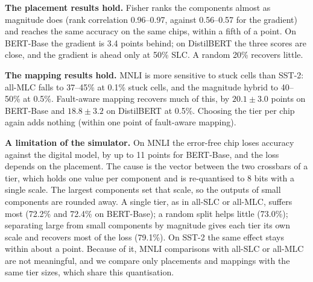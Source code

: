 \textbf{The placement results hold.} Fisher ranks the components almost as magnitude does (rank
correlation 0.96--0.97, against 0.56--0.57 for the gradient) and reaches the same accuracy on the same
chips, within a fifth of a point. On BERT-Base the gradient is 3.4 points behind; on DistilBERT the
three scores are close, and the gradient is ahead only at 50\% SLC. A random 20\% recovers little.

\textbf{The mapping results hold.} MNLI is more sensitive to stuck cells than SST-2: all-MLC falls to
37--45\% at 0.1\% stuck cells, and the magnitude hybrid to 40--50\% at 0.5\%. Fault-aware mapping recovers much of this,
by $20.1\pm3.0$ points on BERT-Base and $18.8\pm3.2$ on DistilBERT at 0.5\%. Choosing the tier per chip
again adds nothing (within one point of fault-aware mapping).

\textbf{A limitation of the simulator.} On MNLI the error-free chip loses accuracy against the digital
model, by up to 11 points for BERT-Base, and the loss depends on the placement. The cause is the vector
between the two crossbars of a tier, which holds one value per component and is re-quantised to 8 bits
with a single scale. The largest components set that scale, so the outputs of small components are
rounded away. A single tier, as in all-SLC or all-MLC, suffers most (72.2\% and 72.4\% on BERT-Base); a
random split helps little (73.0\%); separating large from small components by magnitude gives each tier
its own scale and recovers most of the loss (79.1\%). On SST-2 the same effect stays within about a point.
Because of it, MNLI comparisons with all-SLC or all-MLC are not meaningful, and we compare only placements
and mappings with the same tier sizes, which share this quantisation.
